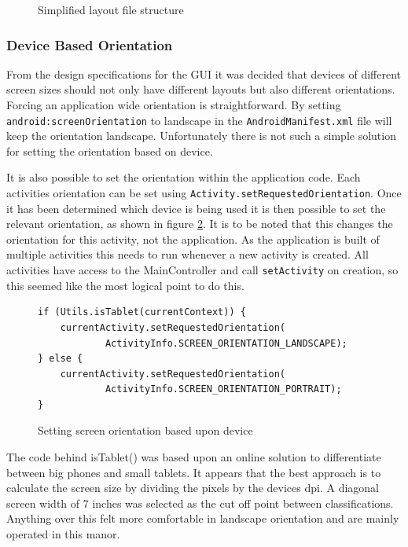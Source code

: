 \begin{figure}[H]
\caption{Simplified layout file structure}
\label{fig:fs}
\end{figure}

\subsubsection*{Device Based Orientation}
From the design specifications for the GUI it was decided that devices of different screen sizes should not only have different layouts but also different orientations. Forcing an application wide orientation is straightforward. By setting \verb|android:screenOrientation| to landscape in the \verb|AndroidManifest.xml| file will keep the orientation landscape. Unfortunately there is not such a simple solution for setting the orientation based on device.

It is also possible to set the orientation within the application code. Each activities orientation can be set using \verb|Activity.setRequestedOrientation|. Once it has been determined which device is being used it is then possible to set the relevant orientation, as shown in figure \ref{fig:orientation}. It is to be noted that this changes the orientation for this activity, not the application. As the application is built of multiple activities this needs to run whenever a new activity is created. All activities have access to the MainController and call \verb|setActivity| on creation, so this seemed like the most logical point to do this.

\begin{figure}[H]
\begin{verbatim}
if (Utils.isTablet(currentContext)) {
    currentActivity.setRequestedOrientation(
            ActivityInfo.SCREEN_ORIENTATION_LANDSCAPE);
} else {
    currentActivity.setRequestedOrientation(
            ActivityInfo.SCREEN_ORIENTATION_PORTRAIT);
}
\end{verbatim}
\caption{Setting screen orientation based upon device}
\label{fig:orientation}
\end{figure}

The code behind isTablet() was based upon an online solution\cite{istablet} to differentiate between big phones and small tablets. It appears that the best approach is to calculate the screen size by dividing the pixels by the devices dpi. A diagonal screen width of 7 inches was selected as the cut off point between classifications. Anything over this felt more comfortable in landscape orientation and are mainly operated in this manor.

